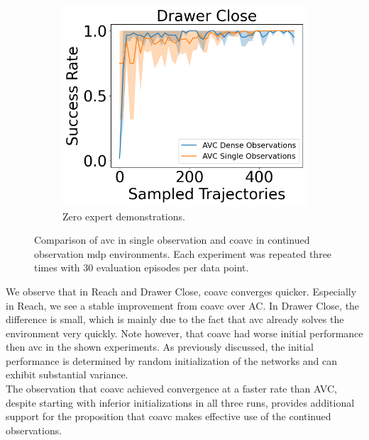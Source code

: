 \begin{figure}[htbp]
\begin{subfigure}[t]{0.32\textwidth}
    \includegraphics[width=\textwidth]{images/dense_vs_sparse_0/Drawer Close.png}
    \caption{Zero expert demonstrations.}
  \end{subfigure}
  \caption{Comparison of \ac{avc} in single observation and \ac{coavc} in continued observation \ac{mdp} environments. Each experiment was repeated three times with 30 evaluation episodes per data point.
  }
  \label{fig:dense_vs_single}
\end{figure}

We observe that in Reach and Drawer Close, \ac{coavc} converges quicker. Especially in Reach, we see a stable improvement from \ac{coavc} over AC. In Drawer Close, the difference is 
small, which is mainly due to the fact that \ac{avc} already solves the environment very quickly. Note however, that \ac{coavc} had worse initial performance then \ac{avc} in the shown experiments. 
As previously discussed, the initial performance is determined by random initialization of the networks and can exhibit substantial 
variance.\\ 

The observation that \ac{coavc} achieved convergence at a faster rate than AVC, despite starting with inferior initializations in 
all three runs, provides additional support for the proposition that \ac{coavc} makes effective use of the continued observations. \\

